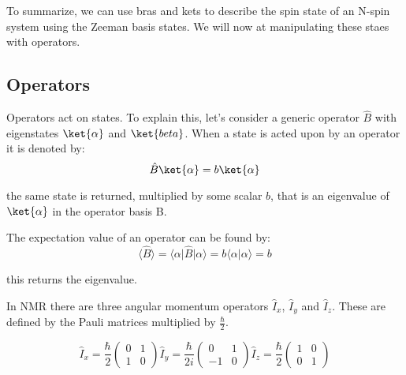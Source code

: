 To summarize, we can use bras and kets to describe the spin state of an N-spin system using the Zeeman basis states. We will now at manipulating these staes with operators.

\subsection{Operators}

Operators act on states. To explain this, let's consider a generic operator $\hat{B}$ with eigenstates $\ket{\alpha}$ and $\ket{beta}$. When a state is acted upon by an operator it is denoted by:
\begin{equation}
  \hat{B}\ket{\alpha} = b\ket{\alpha}
\end{equation}

the same state is returned, multiplied by some scalar $b$, that is an eigenvalue of $\ket{\alpha}$
in the operator basis B.

The expectation value of an operator can be found by:
\begin{equation}\label{eqn:expectation}
  \langle\hat{B}\rangle = \langle\alpha\vert\hat{B}\vert\alpha\rangle = b\langle\alpha\vert\alpha\rangle = b
\end{equation}

this returns the eigenvalue.

In NMR there are three angular momentum operators $\hat{I}_x$, $\hat{I}_y$ and $\hat{I}_z$. These are defined by the Pauli matrices multiplied by $\frac{\hbar}{2}$.

\begin{equation}
  \hat{I}_x=\frac{\hbar}{2}\begin{pmatrix}
    0 & 1\\
    1 & 0
\end{pmatrix}
\hat{I}_y=\frac{\hbar}{2i}\begin{pmatrix}
  0 & 1\\
  -1 & 0
\end{pmatrix}
\hat{I}_z=\frac{\hbar}{2}\begin{pmatrix}
  1 & 0\\
  0 & 1
\end{pmatrix}
\end{equation}

